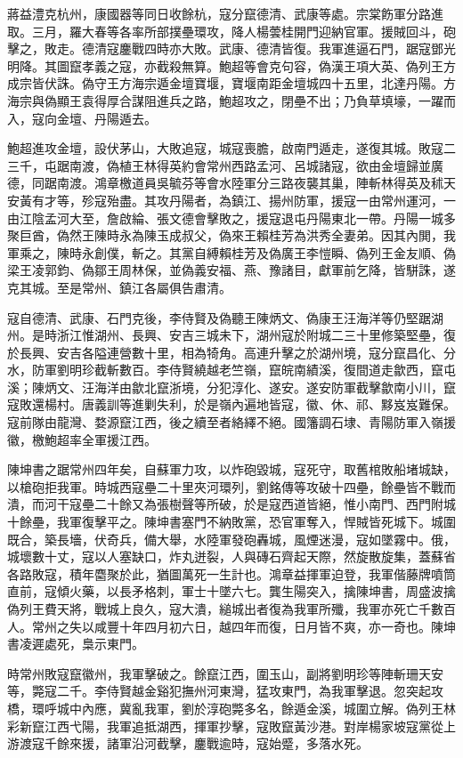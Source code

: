 \begin{pinyinscope}
蔣益澧克杭州，康國器等同日收餘杭，寇分竄德清、武康等處。宗棠飭軍分路進取。三月，羅大春等各率所部撲壘環攻，降人楊蕓桂開門迎納官軍。援賊回斗，砲擊之，敗走。德清寇鏖戰四時亦大敗。武康、德清皆復。我軍進逼石門，踞寇鄧光明降。其圖竄孝義之寇，亦截殺無算。鮑超等會克句容，偽漢王項大英、偽列王方成宗皆伏誅。偽守王方海宗遁金壇寶堰，寶堰南距金壇城四十五里，北達丹陽。方海宗與偽顯王袁得厚合謀阻進兵之路，鮑超攻之，閉壘不出；乃負草填壕，一躍而入，寇向金壇、丹陽遁去。

鮑超進攻金壇，設伏茅山，大敗追寇，城寇喪膽，啟南門遁走，遂復其城。敗寇二三千，屯踞南渡，偽植王林得英約會常州西路孟河、呂城諸寇，欲由金壇歸並廣德，同踞南渡。鴻章檄道員吳毓芬等會水陸軍分三路夜襲其巢，陣斬林得英及秫天安黃有才等，殄寇殆盡。其攻丹陽者，為鎮江、揚州防軍，援寇一由常州運河，一由江陰孟河大至，詹啟綸、張文德會擊敗之，援寇退屯丹陽東北一帶。丹陽一城多聚巨酋，偽然王陳時永為陳玉成叔父，偽來王賴桂芳為洪秀全妻弟。因其內閧，我軍乘之，陳時永創僕，斬之。其黨自縛賴桂芳及偽廣王李愷瞬、偽列王金友順、偽梁王凌郭鈞、偽鄒王周林保，並偽義安福、燕、豫諸目，獻軍前乞降，皆駢誅，遂克其城。至是常州、鎮江各屬俱告肅清。

寇自德清、武康、石門克後，李侍賢及偽聽王陳炳文、偽康王汪海洋等仍堅踞湖州。是時浙江惟湖州、長興、安吉三城未下，湖州寇於附城二三十里修築堅壘，復於長興、安吉各隘連營數十里，相為犄角。高連升擊之於湖州境，寇分竄昌化、分水，防軍劉明珍截斬數百。李侍賢繞越老竺嶺，竄皖南績溪，復間道走歙西，竄屯溪；陳炳文、汪海洋由歙北竄浙境，分犯淳化、遂安。遂安防軍截擊歙南小川，竄寇敗還楊村。唐義訓等進剿失利，於是嶺內遍地皆寇，徽、休、祁、黟岌岌難保。寇前隊由龍灣、婺源竄江西，後之續至者絡繹不絕。國籓調石埭、青陽防軍入嶺援徽，檄鮑超率全軍援江西。

陳坤書之踞常州四年矣，自蘇軍力攻，以炸砲毀城，寇死守，取舊棺敗船堵城缺，以槍砲拒我軍。時城西寇壘二十里夾河環列，劉銘傳等攻破十四壘，餘壘皆不戰而潰，而河干寇壘二十餘又為張樹聲等所破，於是寇西道皆絕，惟小南門、西門附城十餘壘，我軍復擊平之。陳坤書塞門不納敗黨，恐官軍奪入，悍賊皆死城下。城圍既合，築長墻，伏奇兵，備大舉，水陸軍發砲轟城，風煙迷漫，寇如墜霧中。俄，城壞數十丈，寇以人塞缺口，炸丸迸裂，人與磚石齊起天際，然旋散旋集，蓋蘇省各路敗寇，積年麕聚於此，猶圖萬死一生計也。鴻章益揮軍迫登，我軍偕藤牌噴筒直前，寇傾火藥，以長矛格刺，軍士十墜六七。龔生陽突入，擒陳坤書，周盛波擒偽列王費天將，戰城上良久，寇大潰，縋城出者復為我軍所殲，我軍亦死亡千數百人。常州之失以咸豐十年四月初六日，越四年而復，日月皆不爽，亦一奇也。陳坤書凌遲處死，梟示東門。

時常州敗寇竄徽州，我軍擊破之。餘竄江西，圍玉山，副將劉明珍等陣斬珊天安等，斃寇二千。李侍賢越金谿犯撫州河東灣，猛攻東門，為我軍擊退。忽突起攻橋，環呼城中內應，冀亂我軍，劉於淳砲斃多名，餘遁金溪，城圍立解。偽列王林彩新竄江西弋陽，我軍追抵湖西，揮軍抄擊，寇敗竄黃沙港。對岸楊家坡寇黨從上游渡寇千餘來援，諸軍沿河截擊，鏖戰逾時，寇始蹙，多落水死。


\end{pinyinscope}
